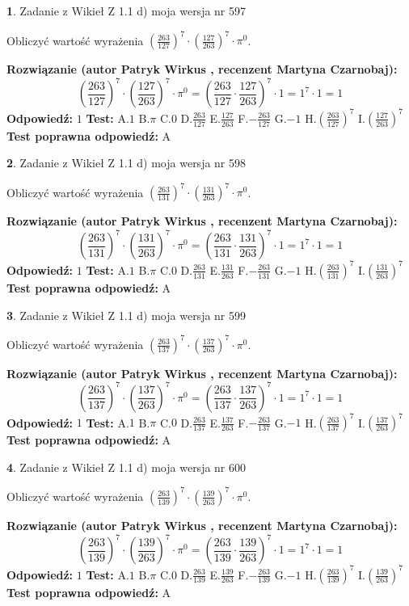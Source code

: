 \documentclass[12pt, a4paper]{article}
\theoremstyle{definition} %
\newtheorem{zad}{}
\newcommand{\zadStart}[1]{\begin{zad}#1\newline}
\newcommand{\zadStop}{\end{zad}}
\newcommand{\rozwStart}[2]{\noindent \textbf{Rozwiązanie (autor #1 , recenzent #2): }\newline}
\newcommand{\rozwStop}{\newline}
\newcommand{\odpStart}{\noindent \textbf{Odpowiedź:}\newline}
\newcommand{\odpStop}{\newline}
\newcommand{\testStart}{\noindent \textbf{Test:}\newline}
\newcommand{\testStop}{\newline}
\newcommand{\kluczStart}{\noindent \textbf{Test poprawna odpowiedź:}\newline}
\newcommand{\kluczStop}{\newline}
\begin{document}
\zadStart{Zadanie z Wikieł Z 1.1 d) moja wersja nr 597}

Obliczyć wartość wyrażenia $(\frac{263}{127})^{7} \cdot (\frac{127}{263})^{7} \cdot \pi^{0}$.
\zadStop
\rozwStart{Patryk Wirkus}{Martyna Czarnobaj}
$$(\frac{263}{127})^{7} \cdot (\frac{127}{263})^{7} \cdot \pi^{0} = (\frac{263}{127} \cdot \frac{127}{263})^{7} \cdot 1 = 1^{7} \cdot 1 = 1$$
\rozwStop
\odpStart
$1$
\odpStop
\testStart
A.$1$ B.$\pi$ C.$0$ D.$\frac{263}{127}$ E.$\frac{127}{263}$
F.$-\frac{263}{127}$ G.$-1$
H.$(\frac{263}{127})^{7}$
I.$(\frac{127}{263})^{7}$
\testStop
\kluczStart
A
\kluczStop



\zadStart{Zadanie z Wikieł Z 1.1 d) moja wersja nr 598}

Obliczyć wartość wyrażenia $(\frac{263}{131})^{7} \cdot (\frac{131}{263})^{7} \cdot \pi^{0}$.
\zadStop
\rozwStart{Patryk Wirkus}{Martyna Czarnobaj}
$$(\frac{263}{131})^{7} \cdot (\frac{131}{263})^{7} \cdot \pi^{0} = (\frac{263}{131} \cdot \frac{131}{263})^{7} \cdot 1 = 1^{7} \cdot 1 = 1$$
\rozwStop
\odpStart
$1$
\odpStop
\testStart
A.$1$ B.$\pi$ C.$0$ D.$\frac{263}{131}$ E.$\frac{131}{263}$
F.$-\frac{263}{131}$ G.$-1$
H.$(\frac{263}{131})^{7}$
I.$(\frac{131}{263})^{7}$
\testStop
\kluczStart
A
\kluczStop



\zadStart{Zadanie z Wikieł Z 1.1 d) moja wersja nr 599}

Obliczyć wartość wyrażenia $(\frac{263}{137})^{7} \cdot (\frac{137}{263})^{7} \cdot \pi^{0}$.
\zadStop
\rozwStart{Patryk Wirkus}{Martyna Czarnobaj}
$$(\frac{263}{137})^{7} \cdot (\frac{137}{263})^{7} \cdot \pi^{0} = (\frac{263}{137} \cdot \frac{137}{263})^{7} \cdot 1 = 1^{7} \cdot 1 = 1$$
\rozwStop
\odpStart
$1$
\odpStop
\testStart
A.$1$ B.$\pi$ C.$0$ D.$\frac{263}{137}$ E.$\frac{137}{263}$
F.$-\frac{263}{137}$ G.$-1$
H.$(\frac{263}{137})^{7}$
I.$(\frac{137}{263})^{7}$
\testStop
\kluczStart
A
\kluczStop



\zadStart{Zadanie z Wikieł Z 1.1 d) moja wersja nr 600}

Obliczyć wartość wyrażenia $(\frac{263}{139})^{7} \cdot (\frac{139}{263})^{7} \cdot \pi^{0}$.
\zadStop
\rozwStart{Patryk Wirkus}{Martyna Czarnobaj}
$$(\frac{263}{139})^{7} \cdot (\frac{139}{263})^{7} \cdot \pi^{0} = (\frac{263}{139} \cdot \frac{139}{263})^{7} \cdot 1 = 1^{7} \cdot 1 = 1$$
\rozwStop
\odpStart
$1$
\odpStop
\testStart
A.$1$ B.$\pi$ C.$0$ D.$\frac{263}{139}$ E.$\frac{139}{263}$
F.$-\frac{263}{139}$ G.$-1$
H.$(\frac{263}{139})^{7}$
I.$(\frac{139}{263})^{7}$
\testStop
\kluczStart
A
\kluczStop
\end{document}
